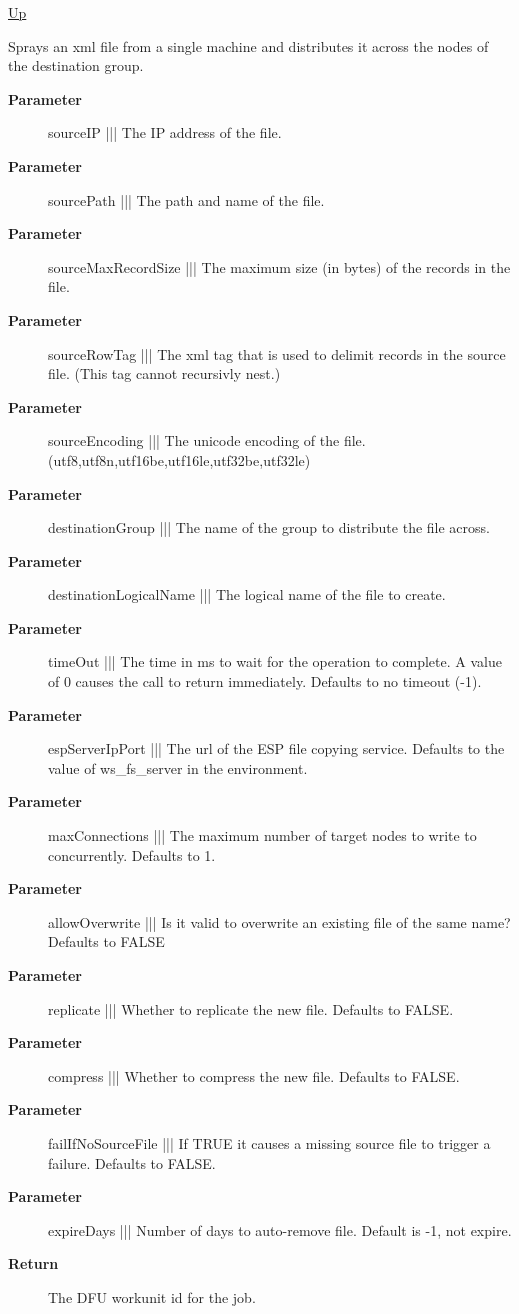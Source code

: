 \hyperlink{ecldoc:File}{Up}

\par
Sprays an xml file from a single machine and distributes it across the nodes of the destination group.

\par
\begin{description}
\item [\textbf{Parameter}] sourceIP ||| The IP address of the file.
\item [\textbf{Parameter}] sourcePath ||| The path and name of the file.
\item [\textbf{Parameter}] sourceMaxRecordSize ||| The maximum size (in bytes) of the records in the file.
\item [\textbf{Parameter}] sourceRowTag ||| The xml tag that is used to delimit records in the source file. (This tag cannot recursivly nest.)
\item [\textbf{Parameter}] sourceEncoding ||| The unicode encoding of the file. (utf8,utf8n,utf16be,utf16le,utf32be,utf32le)
\item [\textbf{Parameter}] destinationGroup ||| The name of the group to distribute the file across.
\item [\textbf{Parameter}] destinationLogicalName ||| The logical name of the file to create.
\item [\textbf{Parameter}] timeOut ||| The time in ms to wait for the operation to complete. A value of 0 causes the call to return immediately. Defaults to no timeout (-1).
\item [\textbf{Parameter}] espServerIpPort ||| The url of the ESP file copying service. Defaults to the value of ws\_fs\_server in the environment.
\item [\textbf{Parameter}] maxConnections ||| The maximum number of target nodes to write to concurrently. Defaults to 1.
\item [\textbf{Parameter}] allowOverwrite ||| Is it valid to overwrite an existing file of the same name? Defaults to FALSE
\item [\textbf{Parameter}] replicate ||| Whether to replicate the new file. Defaults to FALSE.
\item [\textbf{Parameter}] compress ||| Whether to compress the new file. Defaults to FALSE.
\item [\textbf{Parameter}] failIfNoSourceFile ||| If TRUE it causes a missing source file to trigger a failure. Defaults to FALSE.
\item [\textbf{Parameter}] expireDays ||| Number of days to auto-remove file. Default is -1, not expire.
\item [\textbf{Return}] The DFU workunit id for the job.
\end{description}

